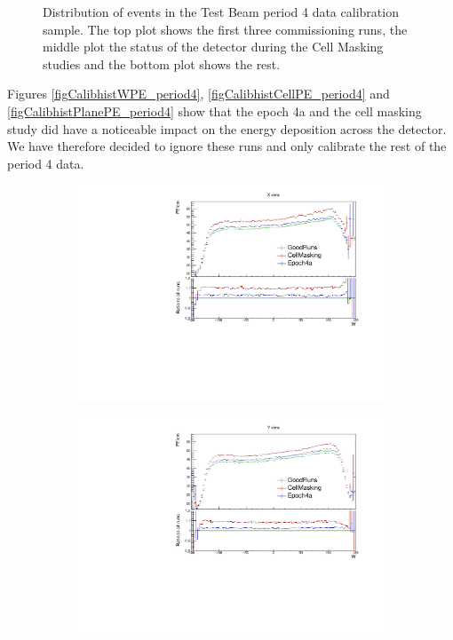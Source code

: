 \documentclass[12pt,a4paper]{article}
\begin{document}
\begin{figure}[!hbtp]
\begin{subfigure}[b]{\textwidth}
\end{subfigure}
\caption{Distribution of events in the Test Beam period 4 data calibration sample. The top plot shows the first three commissioning runs, the middle plot the status of the detector during the Cell Masking studies and the bottom plot shows the rest.}
\label{figCalibhist_period4}
\end{figure}

Figures \ref{figCalibhistWPE_period4}, \ref{figCalibhistCellPE_period4} and \ref{figCalibhistPlanePE_period4} show that the epoch 4a and the cell masking study did have a noticeable impact on the energy deposition across the detector. We have therefore decided to ignore these runs and only calibrate the rest of the period 4 data.

\begin{figure}[!hbtp]
\centering
\begin{subfigure}[b]{0.495\textwidth}
\centering
\includegraphics[width=\textwidth]{Plots/Attenprofs_P4Data_WPE_corr_xy_X_Combined.pdf}
\end{subfigure}
\begin{subfigure}[b]{0.495\textwidth}
\centering
\includegraphics[width=\textwidth]{Plots/Attenprofs_P4Data_WPE_corr_xy_Y_Combined.pdf}

\end{subfigure}
\end{figure}
\end{document}
